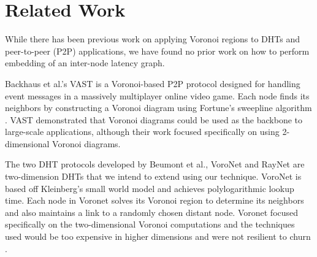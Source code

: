 \documentclass[11pt, conference, letterpaper]{IEEEtran}
\begin{document}


\section{Related Work}
\label{sec:related}
While there has been previous work on applying Voronoi regions to DHTs and peer-to-peer (P2P) applications, we have found no prior work on how to perform embedding of an inter-node latency graph.   

Backhaus et al.'s  VAST \cite{Backhaus:2007:VAS:1326257.1326266} is a Voronoi-based P2P protocol designed for handling event messages in a massively multiplayer online video game.  
Each node finds its neighbors by constructing a Voronoi diagram using Fortune's sweepline algorithm \cite{fortune1987sweepline}.  
VAST demonstrated that Voronoi diagrams could be used as the backbone to large-scale applications, although their work focused specifically on using 2-dimensional Voronoi diagrams.

The two DHT protocols developed by Beumont et al., VoroNet \cite{voronet} and RayNet \cite{raynet} are two-dimension DHTs that we intend to extend using our technique.
VoroNet is based off Kleinberg's small world model \cite{kleinberg2000navigation} and achieves polylogarithmic lookup time.  
Each node in Voronet solves its Voronoi region to determine its neighbors and also maintains a link to a randomly chosen distant node.
Voronet focused specifically on the two-dimensional Voronoi computations and the techniques used would be too expensive in higher dimensions and were not resilient to churn  \cite{raynet}.
\end{document}
